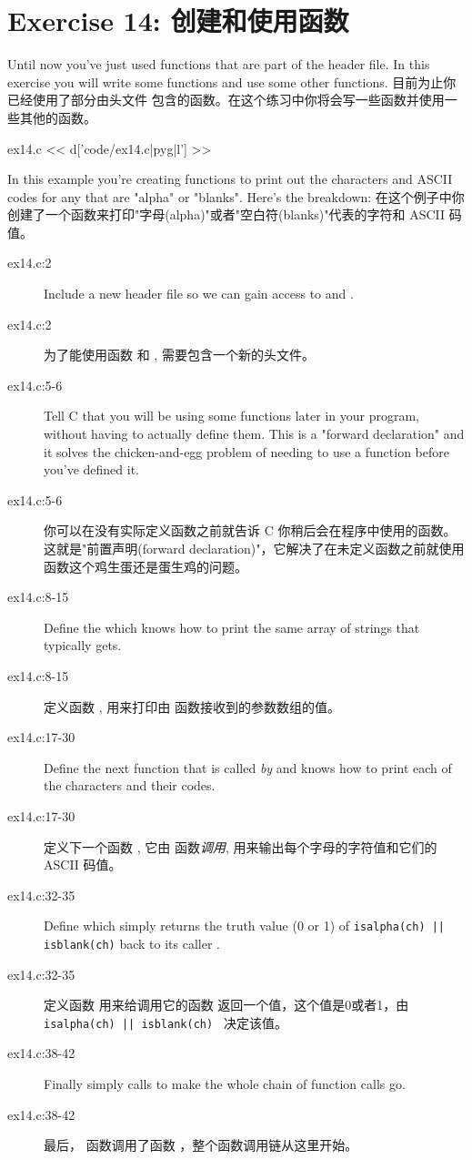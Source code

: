 \chapter{Exercise 14: 创建和使用函数}

Until now you've just used functions that are part of the
 header file.  In this exercise you will write
some functions and use some other functions.
目前为止你已经使用了部分由头文件  包含的函数。在这个练习中你将会写一些函数并使用一些其他的函数。
\begin{code}{ex14.c}
<< d['code/ex14.c|pyg|l'] >>
\end{code}

In this example you're creating functions to print out the
characters and ASCII codes for any that are "alpha" or "blanks".
Here's the breakdown:
在这个例子中你创建了一个函数来打印"字母(alpha)"或者"空白符(blanks)"代表的字符和 ASCII 码值。
\begin{description}
\item[ex14.c:2] Include a new header file so we can gain access to
     and .
\item[ex14.c:2] 为了能使用函数  和 , 需要包含一个新的头文件。
\item[ex14.c:5-6] Tell C that you will be using some functions later
    in your program, without having to actually define them.
    This is a "forward declaration" and it solves the chicken-and-egg
    problem of needing to use a function before you've defined it.
\item[ex14.c:5-6] 你可以在没有实际定义函数之前就告诉 C 你稍后会在程序中使用的函数。这就是"前置声明(forward declaration)"，它解决了在未定义函数之前就使用函数这个鸡生蛋还是蛋生鸡的问题。
\item[ex14.c:8-15] Define the  which knows how
    to print the same array of strings that  typically
    gets.
\item[ex14.c:8-15] 定义函数 , 用来打印由  函数接收到的参数数组的值。
\item[ex14.c:17-30] Define the next function  that 
    is called \emph{by}  and knows
    how to print each of the characters and their codes.
\item[ex14.c:17-30] 定义下一个函数 , 它由  函数\emph{调用}, 用来输出每个字母的字符值和它们的 ASCII 码值。
\item[ex14.c:32-35] Define  which simply returns
    the truth value (0 or 1) of \verb,isalpha(ch) || isblank(ch),
    back to its caller .
\item[ex14.c:32-35] 定义函数  用来给调用它的函数  返回一个值，这个值是0或者1，由 \verb,isalpha(ch) || isblank(ch) , 决定该值。
\item[ex14.c:38-42] Finally  simply calls 
    to make the whole chain of function calls go.
\item[ex14.c:38-42] 最后， 函数调用了函数 ，整个函数调用链从这里开始。
\end{description}

